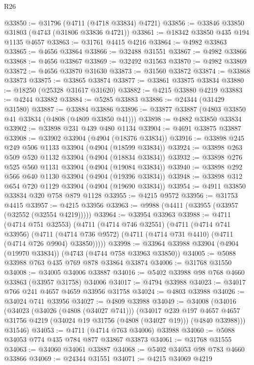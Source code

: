 \begin{lexlean}{R26}
\begin{coremodule}
@33850 := @31796 (@4711 (@4718 @33834) @4721)
@33856 := @33846 @33850 @31803 (@4743 (@31806 @33836 @4721))
@33861 := @18342 @33850 @435 @194 @1135 @4657
@33863 := @31761 @4415 @4216
@33864 := @4982 @33863
@33865 := @4656 @33864
@33866 := @32488 @31551
@33867 := @4982 @33866
@33868 := @4656 @33867
@33869 := @32492 @31563
@33870 := @4982 @33869
@33872 := @4656 @33870 @31630
@33873 := @31560 @33872
@33874 := @33868 @33873
@33875 := @33865 @33874
@33877 := @33861 @33875 @33834
@33880 := @18250 (@25328 @31617 @31620)
@33882 := @4215 @33880 @4219
@33883 := @4244 @33882
@33884 := @5285 @33883
@33886 := @24344 (@31429 @31580)
@33887 := @33884 @33886
@33896 := @33877 @33887 (@4803 @33850 @41 @33834 (@4808 (@4809 @33850 @41)))
@33898 := @4882 @33850 @33834
@33902 := @33898 @231 @439 @480 @1134
@33904 := @4691 @33875 @33887
@33908 := @33902 @33904 (@4904 (@18376 @33834))
@33916 := @33898 @245 @249 @506 @1133 @33904 (@4904 (@18599 @33834))
@33924 := @33898 @263 @509 @520 @1132 @33904 (@4904 (@18834 @33834))
@33932 := @33898 @276 @525 @560 @1131 @33904 (@4904 (@19084 @33834))
@33940 := @33898 @292 @566 @640 @1130 @33904 (@4904 (@19396 @33834))
@33948 := @33898 @312 @654 @720 @1129 @33904 (@4904 (@19690 @33834))
@33954 := @4911 @33850 @33834 @320 @758 @879 @1128
@33955 := @4215 @9572
@33956 := @31753 @4415
@33957 := @4215 @33956
@33963 := @9988 (@4411 (@33955 (@33957 (@32552 (@32554 @4219)))))
@33964 := @33954 @33963
@33988 := @4711
    (@4714 @751 @32553)
    (@4711
      (@4714 @746 @32551)
      (@4711
        (@4714 @741 @33956)
        (@4711 (@4714 @736 @9572) (@4711 (@4714 @731 @4410) (@4711 (@4714 @726 @9904) @33850)))))
@33998 := @33964 @33988 @33904 (@4904 (@19970 @33834)) (@4743 (@4744 @758 @33963 @33850))
@34005 := @5088 @33988 @763 @435 @769 @878 @33864 @33874
@34006 := @31768 @31550
@34008 := @34005 @34006 @33887
@34016 := @5402 @33988 @98 @768 @4660 @33863 (@33957 @31758) @34006
@34017 := @4794 @33988
@34023 := @34017 @766 @241 @4657 @4659 @33956 @31758
@34024 := @4803 @33988
@34026 := @34024 @741 @33956
@34027 := @4809 @33988
@34049 := @34008
    (@34016
      (@34023
        (@34026 (@4808 (@34027 @741)))
        (@34017
          @239
          @197
          @4657
          @4657
          @31756
          @4219
          (@34024 @19 @31756 (@4808 (@34027 @19)))
          (@4840 @33988)))
      @31546)
@34053 := @4711 (@4714 @763 @34006) @33988
@34060 := @5088 @34053 @774 @435 @784 @877 @33867 @33873
@34061 := @31768 @31555
@34063 := @34060 @34061 @33887
@34068 := @5402 @34053 @98 @783 @4660 @33866
@34069 := @24344 @31551
@34071 := @4215 @34069 @4219

\end{coremodule}
\end{lexlean}
